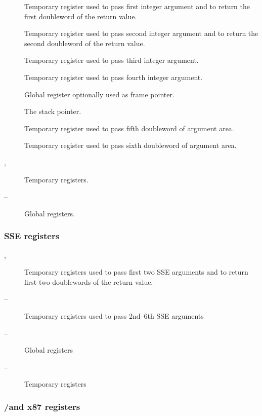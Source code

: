 \begin{description}
  \item [\RAX]
    Temporary register used to pass first integer argument and to return
    the first doubleword of the return value.
  \item [\RDX]
    Temporary register used to pass second integer argument
    and to return the second doubleword of the return value.
  \item [\RCX] Temporary register used to pass third integer argument.
  \item [\RBX] Temporary register used to pass fourth integer argument.
  \item [\RBP] Global register optionally used as frame pointer.
  \item [\RSP] The stack pointer.
  \item [\RSI]
    Temporary register used to pass fifth doubleword of argument area.
  \item [\RDI] 
    Temporary register used to pass sixth doubleword of argument area.
  \item [, ] Temporary registers.
  \item [ -- ] Global registers.
\end{description}

\subsubsection {SSE registers}

\begin{description}
  \item [, ] Temporary registers used to pass first two SSE arguments
    and to return first two doublewords of the return value.
  \item [ -- ] Temporary registers used to pass 2nd--6th SSE arguments
  \item [ -- ] Global registers
  \item [ -- ] Temporary registers
\end{description}

\subsubsection {\MMX/\threednow and x87 registers}

